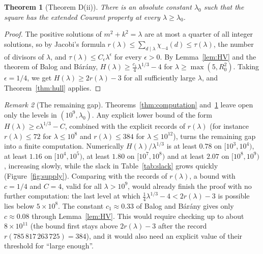 \documentclass[11pt]{amsart}
\newtheorem{theorem}{Theorem}[section]
\theoremstyle{definition}
\theoremstyle{remark}
\newtheorem{remark}[theorem]{Remark}
\newcommand{\SweepX}{10^9}
\numberwithin{equation}{section}
\begin{document}
\begin{theorem}[Theorem D(ii)]\label{thm:large}
There is an absolute constant $\lambda_0$ such that the square has the extended Courant
property at every $\lambda\ge\lambda_0$.
\end{theorem}

\begin{proof}
The positive solutions of $m^2+k^2=\lambda$ are at most a quarter of all integer solutions, so
by Jacobi's formula $r(\lambda)\le\sum_{d\mid\lambda}\chi_{-4}(d)\le\tau(\lambda)$, the number of
divisors of $\lambda$, and $\tau(\lambda)\le C_\epsilon\lambda^{\epsilon}$ for every
$\epsilon>0$. By Lemma~\ref{lem:HV} and the theorem of Balog and B\'ar\'any,
$H(\lambda)\ge\tfrac{c_1}{4}\lambda^{1/3}-4$ for $\lambda\ge\max(5,R_0^2)$. Taking $\epsilon=1/4$, we
get $H(\lambda)\ge2r(\lambda)-3$ for all sufficiently large $\lambda$, and
Theorem~\ref{thm:hull} applies.
\end{proof}

\begin{remark}[The remaining gap]\label{rem:gap}
Theorems~\ref{thm:computation} and~\ref{thm:large} leave open only the levels in
$(\SweepX,\lambda_0)$. Any explicit lower bound of the form $H(\lambda)\ge c\lambda^{1/3}-C$,
combined with the explicit records of $r(\lambda)$ (for instance $r(\lambda)\le72$ for
$\lambda\le10^8$ and $r(\lambda)\le384$ for $\lambda\le10^{12}$), turns the remaining gap into a
finite computation. Numerically $H(\lambda)/\lambda^{1/3}$ is at least $0.78$ on $[10^3,10^4)$,
at least $1.16$ on $[10^4,10^5)$, at least $1.80$ on $[10^7,10^8)$ and at least $2.07$ on
$[10^8,10^9)$, increasing slowly, while the slack in Table~\ref{tab:slack} grows quickly
(Figure~\ref{fig:supply}). Comparing with the records of $r(\lambda)$, a bound with $c=1/4$ and
$C=4$, valid for all $\lambda>\SweepX$, would already finish the proof with no further
computation: the last level at which $\tfrac14\lambda^{1/3}-4<2r(\lambda)-3$ is possible lies
below $5\times10^8$. The constant $c_1\approx0.33$ of Balog and B\'ar\'any gives only
$c\approx0.08$ through Lemma~\ref{lem:HV}. This would require checking up to about
$8\times10^{11}$ (the bound first stays above $2r(\lambda)-3$ after the record
$r(785\,817\,263\,725)=384$), and it would also need an explicit value of their threshold for
``large enough''.
\end{remark}
\end{document}
